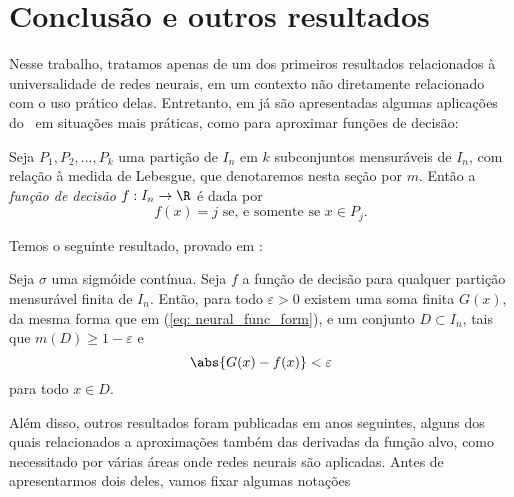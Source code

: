 \section{Conclusão e outros resultados}

Nesse trabalho, tratamos apenas de um dos primeiros resultados relacionados à universalidade de redes neurais, em um contexto não diretamente relacionado com o uso prático delas.
Entretanto, em \cite{cybenko89} já são apresentadas algumas aplicações do \uat \ em situações mais práticas, como para aproximar funções de decisão:
\begin{defn}
    Seja \( P_{ 1 }, P_{ 2 }, \dots, P_{ k } \) uma partição de \( I_{ n } \) em \( k \) subconjuntos mensuráveis de \( I_{ n } \), com relação à medida de Lebesgue, que denotaremos nesta seção por \( m \).
    Então a \emph{função de decisão} \( f : I_{ n } \to \R \) é dada por
    \begin{equation*}
        f(x) = j \text{ se, e somente se } x \in P_{ j }
    .\end{equation*}
\end{defn}
Temos o seguinte resultado, provado em \cite{cybenko89}:
\begin{teo}
    Seja \( \sigma \) uma sigmóide contínua.
    Seja \( f \) a função de decisão para qualquer partição mensurável finita de \( I_{ n } \).
    Então, para todo \( \varepsilon > 0 \) existem uma soma finita \( G(x) \), da mesma forma que em (\ref{eq: neural_func_form}), e um conjunto \( D \subset I_{ n } \), tais que \( m(D) \geq 1 - \varepsilon \) e
    \begin{equation*}
        \abs{ 
            G(x) - f(x)
        } < \varepsilon
    \end{equation*}
    para todo \( x \in D \).
\end{teo}

Além disso, outros resultados foram publicadas em anos seguintes, alguns dos quais relacionados a aproximações também das derivadas da função alvo, como necessitado por várias áreas onde redes neurais são aplicadas.
Antes de apresentarmos dois deles, vamos fixar algumas notações

